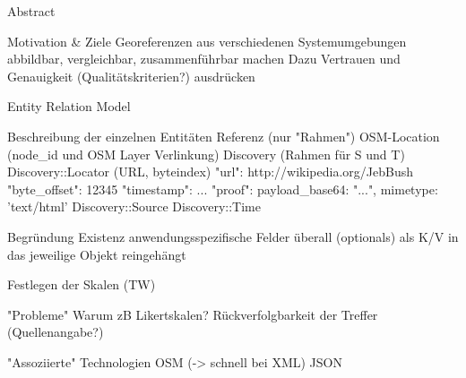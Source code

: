 Abstract

Motivation & Ziele
  Georeferenzen aus verschiedenen Systemumgebungen abbildbar, vergleichbar, zusammenführbar machen
  Dazu Vertrauen und Genauigkeit (Qualitätskriterien?) ausdrücken
  

Entity Relation Model

  Beschreibung der einzelnen Entitäten
    Referenz (nur "Rahmen")
    OSM-Location (node_id und OSM Layer Verlinkung)
    Discovery (Rahmen für S und T)
    Discovery::Locator (URL, byteindex)
        "url": http://wikipedia.org/JebBush
        "byte_offset": 12345 %
        "timestamp": ...
        "proof": { payload_base64: "...", mimetype: 'text/html' }
    Discovery::Source
    Discovery::Time

    Begründung Existenz anwendungsspezifische Felder überall (optionals) als K/V in das jeweilige Objekt reingehängt

  Festlegen der Skalen (TW)

"Probleme"
   Warum zB Likertskalen? 
   Rückverfolgbarkeit der Treffer (Quellenangabe?)

"Assoziierte" Technologien 
  OSM (-> schnell bei XML) %
  JSON

